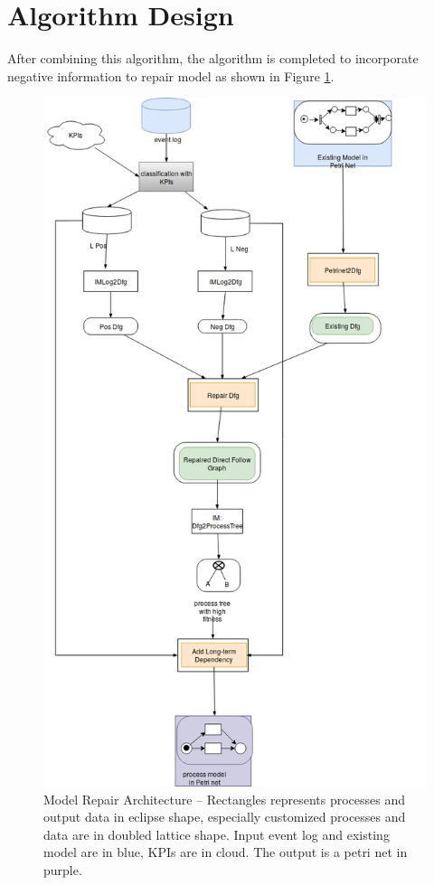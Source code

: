 \documentclass[]{article}
\begin{document}
\section{Algorithm Design}
After combining this algorithm, the algorithm is completed to incorporate negative information to repair model as shown in Figure \ref{fig:architecture}.
\begin{figure}
	\includegraphics[width=\textwidth, height=\textheight]{FD_architecture_detail_02.png}
	\caption[Model Repair Architecture]{Model Repair Architecture -- \small Rectangles represents processes and output data in eclipse shape, especially customized processes and data are in doubled lattice shape. Input event log and existing model are in blue, KPIs are in cloud. The output is a petri net in purple. }
	\label{fig:architecture}
\end{figure} 
\end{document}
